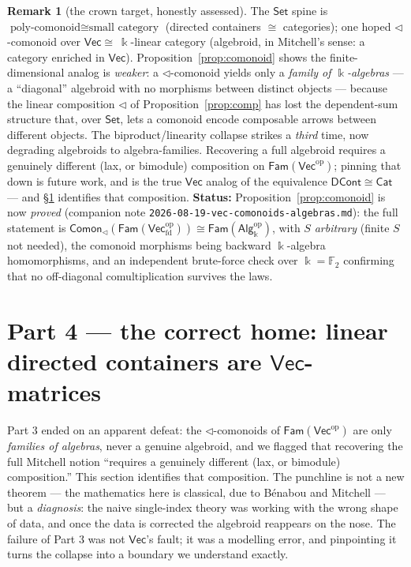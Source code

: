 \documentclass[11pt]{amsart}
\theoremstyle{plain}
\theoremstyle{definition}
\newtheorem{remark}[theorem]{Remark}
\renewcommand{\Vec}{\mathsf{Vec}}
\newcommand{\Set}{\mathsf{Set}}
\newcommand{\Cat}{\mathsf{Cat}}
\newcommand{\Fam}{\mathsf{Fam}}
\newcommand{\Comon}{\mathsf{Comon}}
\newcommand{\Alg}{\mathsf{Alg}}
\newcommand{\op}{\mathrm{op}}
\newcommand{\fld}{\Bbbk}
\newcommand{\iso}{\cong}
\begin{document}
\begin{remark}[the crown target, honestly assessed]
The $\Set$ spine is $\text{poly-comonoid}\iso\text{small category}$
(directed containers $\iso$ categories); one hoped $\lhd$-comonoid over $\Vec
\iso\ \fld$-linear category (algebroid, in Mitchell's sense: a category enriched
in $\Vec$). Proposition~\ref{prop:comonoid} shows the finite-dimensional analog
is \emph{weaker}: a $\lhd$-comonoid yields only a \emph{family of $\fld$-algebras}
--- a ``diagonal'' algebroid with no morphisms between distinct objects ---
because the linear composition $\lhd$ of Proposition~\ref{prop:comp} has lost
the dependent-sum structure that, over $\Set$, lets a comonoid encode composable
arrows between different objects. The biproduct/linearity collapse strikes a
\emph{third} time, now degrading algebroids to algebra-families. Recovering a
full algebroid requires a genuinely different (lax, or bimodule) composition on
$\Fam(\Vec^\op)$; pinning that down is future work, and is the true $\Vec$
analog of the equivalence $\mathsf{DCont}\iso\Cat$ --- and \S\ref{sec:algebroid} identifies
that composition. \textbf{Status:} Proposition~\ref{prop:comonoid} is now
\emph{proved} (companion note \texttt{2026-08-19-vec-comonoids-algebras.md}): the
full statement is $\Comon_\lhd(\Fam(\Vec_{\mathrm{fd}}^\op))\iso\Fam(\Alg_\fld^\op)$,
with $S$ \emph{arbitrary} (finite $S$ not needed), the comonoid morphisms being
backward $\fld$-algebra homomorphisms, and an independent brute-force check over
$\fld=\mathbb F_2$ confirming that no off-diagonal comultiplication survives the
laws.
\end{remark}

\section{Part 4 --- the correct home: linear directed containers are
$\Vec$-matrices}\label{sec:algebroid}

Part 3 ended on an apparent defeat: the $\lhd$-comonoids of
$\Fam(\Vec^\op)$ are only \emph{families of algebras}, never a genuine algebroid,
and we flagged that recovering the full Mitchell notion ``requires a genuinely
different (lax, or bimodule) composition.'' This section identifies that
composition. The punchline is not a new theorem --- the mathematics here is
classical, due to B\'enabou and Mitchell --- but a \emph{diagnosis}: the naive
single-index theory was working with the wrong shape of data, and once the data is
corrected the algebroid reappears on the nose. The failure of Part 3 was not
$\Vec$'s fault; it was a modelling error, and pinpointing it turns the collapse
into a boundary we understand exactly.
\end{document}
